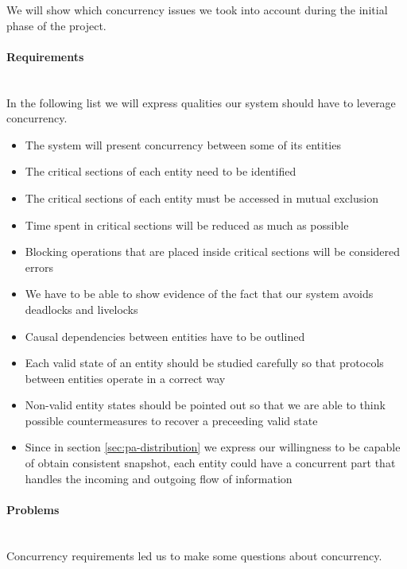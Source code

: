 We will show which concurrency issues we took into account during the initial phase of
the project.

\paragraph{Requirements} \mbox{} \\

In the following list we will express qualities our system should have to
leverage concurrency.

\begin{itemize}
\item The system will present concurrency between some of its entities
\item The critical sections of each entity need to be identified
\item The critical sections of each entity  must be accessed in mutual exclusion
\item Time spent in critical sections will be reduced as much as possible
\item Blocking operations that are placed inside critical sections will be
  considered errors
\item We have to be able to show evidence of the fact that our system avoids
  deadlocks and livelocks
\item Causal dependencies between entities have to be outlined
\item Each valid state of an entity should be studied carefully so that
  protocols between entities operate in a correct way
\item Non-valid entity states should be pointed out so that we are able to
  think possible countermeasures to recover a preceeding valid state
\item Since in section \ref{sec:pa-distribution} we express our willingness to
  be capable of obtain consistent snapshot, each entity could have a concurrent
  part that handles the incoming and outgoing flow of information
\end{itemize}

\paragraph{Problems} \mbox{} \\

Concurrency requirements led us to make some questions about concurrency.

